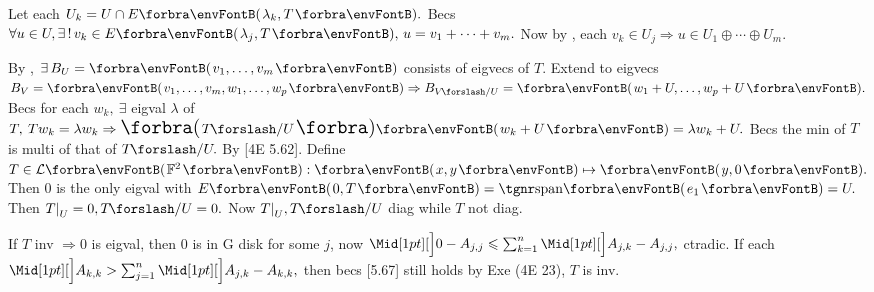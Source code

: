 Let each $U_k=U\cap E\Par{\lambda_k,T}.$ Becs $\forall u\in U,\exists\,!\,v_k\in E\Par{\lambda_j,T},\,u=v_1+\dots+v_m.$\parSol{}
Now by , each $v_k\in U_j\Rightarrow u\in U_1\oplus\cdots\oplus U_m.$\PfEnd
\SepLine


By , $\exists\,B_U=\Par{v_1,\dots,v_m}$ consists of eigvecs of $T.$\parSol{}
Extend to eigvecs $B_V=\Par{v_1,\dots,v_m,w_1,\dots,w_p}\Rightarrow B_{V\XSlash U}=\Par{w_1+U,\dots,w_p+U}.$\parSol{}
Becs for each $w_k,\:\exists$ eigval $\lambda$ of $T,\:Tw_k=\lambda w_k\Rightarrow\BigPar{T\XSlash U}\Par{w_k+U}=\lambda w_k+U.$\PfEnd\vspace{2pt}\parSol{}
\Or Becs the min of $T$ is multi of that of $T\XSlash U.$ By [4E 5.62].\PfEnd\vspace{2pt}
\AExa Define $T\in\Lm{\Fbb^2}:\Par{x,y}\mapsto\Par{y,0}.$ Then $0$ is the only eigval with $E\Par{0,T}=\Span{e_1}=U.$\parExa
Then $T\mmid_U=0,T\XSlash U=0.$ \;Now $T\mmid_U,T\XSlash U$ diag while $T$ not diag.\PfEnd
\SepLine


If $T$ inv $\Rightarrow 0$ is eigval, then $0$ is in G disk for some $j$, now $\aXMid{0-A_{j,j}}\leqslant\sum_{k=1}^n\aXMid{A_{j,k}}-A_{j,j},$ ctradic.\PfEnd\vspace{2pt}
\AComm If each $\aXMid{A_{k,k}}>\sum_{j=1}^n\aXMid{A_{j,k}}-A_{k,k},$ then becs [5.67] still holds by Exe (4E 23), $T$ is inv.
\SepLine

